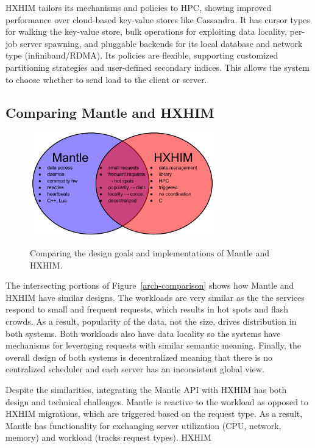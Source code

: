 HXHIM tailors its mechanisms and policies to HPC, showing improved performance
over cloud-based key-value stores like Cassandra. It has cursor types for
walking the key-value store, bulk operations for exploiting data locality,
per-job server spawning, and pluggable backends for its local database and
network type (infiniband/RDMA). Its policies are flexible, supporting
customized partitioning strategies and user-defined secondary indices. This
allows the system to choose whether to send load to the client or server.

\subsection{Comparing Mantle and HXHIM}
\begin{figure}[tb]
  \noindent\includegraphics[width=19pc,angle=0]{figures/arch-comparison.png}\\
  \caption{Comparing the design goals and implementations of Mantle and HXHIM.}
  \label{fig:arch-comparison}
\end{figure}

The intersecting portions of Figure~\ref{arch-comparison} shows how Mantle and
HXHIM have similar designs. The workloads are very similar as the the services
respond to small and frequent requests, which results in hot spots and flash
crowds. As a result, popularity of the data, not the size, drives distribution
in both systems. Both workloads also have data locality so the systems have
mechanisms for leveraging requests with similar semantic meaning. Finally, the
overall design of both systems is decentralized meaning that there is no
centralized scheduler and each server has an inconsistent global view.

Despite the similarities, integrating the Mantle API with HXHIM has both design
and technical challenges. Mantle is reactive to the workload as opposed to
HXHIM migrations, which are triggered based on the request type. As a result,
Mantle has functionality for exchanging server 
utilization (CPU, network, memory) and workload (tracks request types). HXHIM 

